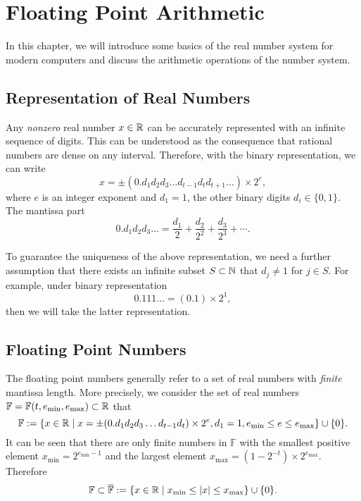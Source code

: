 
\chapter{Floating Point Arithmetic}
\label{Ch: 1-Flo-Poi-Ari}

In this chapter, we will introduce some basics of the real number system for modern computers and discuss the arithmetic operations of the number system.

\section{Representation of Real Numbers}
\label{Sec: 1-Rep-Rea-Num}

Any \emph{nonzero} real number $x\in \mathbb R$ can be accurately represented with an infinite sequence of digits. This can be understood as the consequence that rational numbers are dense on any interval. Therefore, with the binary representation, we can write 
$$x = \pm (0.d_1 d_2 d_3\dots d_{t-1} d_t d_{t+1}\dots) \times 2^e,$$
where $e$ is an integer exponent and $d_1=1$, the other binary digits $d_i\in \{0, 1\}$. The mantissa part
$$0.d_1 d_2 d_3\dots =  \frac{d_1}{2} + \frac{d_2}{2^2} + \frac{d_3}{2^3} + \cdots.$$

\begin{remark}
    To guarantee the uniqueness of the above representation, we need a further assumption that there exists an infinite subset $S\subset \mathbb N$ that $d_j\neq 1$ for $j\in S$. For example, under binary representation
    $$0.111\dots = (0.1)\times 2^1,$$
    then we will take the latter representation.
\end{remark}

\section{Floating Point Numbers}
\label{Sec: 1-Flo-Poi-Num}

The floating point numbers generally refer to a set of real numbers with \emph{finite} mantissa length. More precisely, we consider the set of real numbers $\mathbb{F} = \mathbb{F}(t, e_{\min}, e_{\max})\subset \mathbb R$ that
$$\mathbb{F} := \{x\in \mathbb R\mid x = \pm (0.d_1 d_2 d_3\dots d_{t-1} d_t) \times 2^e, d_1 =1,  e_{\min}\le e\le e_{\max}\}\cup \{0\}.$$
It can be seen that there are only finite numbers in $\mathbb{F}$ with the smallest positive element $x_{\min} = 2^{e_{\min}-1}$ and the largest element $x_{\max} = ( 1- 2^{-t} )\times 2^{e_{\max} }$. Therefore $$\mathbb{F}\subset \overline{\mathbb{F}}:= \{ x\in \mathbb R\mid x_{\min} \le |x| \le x_{\max}\}\cup \{ 0\}.$$

